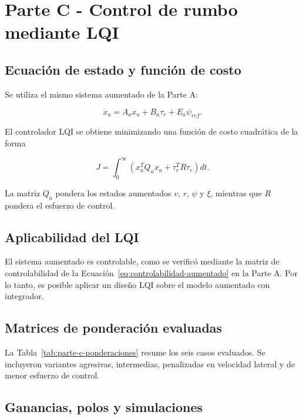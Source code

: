 \section{Parte C - Control de rumbo mediante LQI}

\subsection{Ecuación de estado y función de costo}

Se utiliza el mismo sistema aumentado de la Parte A:

\begin{equation}
\dot{x}_a = A_a x_a + B_a \tau_r + E_a \psi_{ref}.
\end{equation}

El controlador LQI se obtiene minimizando una función de costo cuadrática de la forma

\begin{equation}
J = \int_0^\infty \left(x_a^T Q_a x_a + \tau_r^T R \tau_r\right) dt.
\end{equation}

La matriz $Q_a$ pondera los estados aumentados $v$, $r$, $\psi$ y $\xi$, mientras que $R$ pondera el esfuerzo de control.

\subsection{Aplicabilidad del LQI}

El sistema aumentado es controlable, como se verificó mediante la matriz de controlabilidad de la Ecuación~\eqref{eq:controlabilidad-aumentado} en la Parte A. Por lo tanto, es posible aplicar un diseño LQI sobre el modelo aumentado con integrador.

\subsection{Matrices de ponderación evaluadas}

La Tabla~\ref{tab:parte-c-ponderaciones} resume los seis casos evaluados. Se incluyeron variantes agresivas, intermedias, penalizadas en velocidad lateral y de menor esfuerzo de control.



\subsection{Ganancias, polos y simulaciones}

